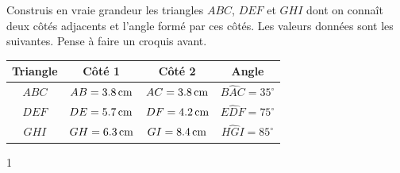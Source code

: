 \documentclass[a4paper,11pt]{report}
\begin{document}
\begin{exo}{Construis en vraie grandeur les triangles $ABC$, $DEF$ et $GHI$ dont on connaît deux côtés adjacents et l'angle formé par ces côtés. Les valeurs données sont les suivantes. Pense à faire un croquis avant.
\begin{center}
\begin{tabular}{|c|c|c|c|}
\hline
\textbf{Triangle} & \textbf{Côté 1} & \textbf{Côté 2} & \textbf{Angle} \\
\hline
$ABC$ & $AB = \tunit{3,8}{cm}$ & $AC = \tunit{3,8}{cm}$ & $\widehat{BAC} = 35^\circ$ \\
\hline
$DEF$ & $DE = \tunit{5,7}{cm}$ & $DF = \tunit{4,2}{cm}$ & $\widehat{EDF} = 75^\circ$ \\
\hline
$GHI$ & $GH = \tunit{6,3}{cm}$ & $GI = \tunit{8,4}{cm}$ & $\widehat{HGI} = 85^\circ$ \\
\hline
\end{tabular}
\end{center}
}{1}
\end{exo}
\end{document}
